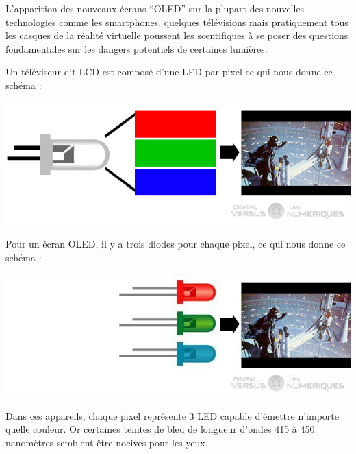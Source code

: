 \documentclass[12pt, a4paper]{report}
\begin{document}
L'apparition des nouveaux écrans ``OLED'' sur la plupart des nouvelles technologies comme les smartphones, quelques télévisions mais pratiquement tous les casques de la réalité virtuelle poussent les scentifiques  à se poser des questions fondamentales sur les dangers potentiels de certaines lumières.

Un téléviseur dit  LCD  est composé d'une LED par pixel ce qui nous donne ce schéma :

\begin{center}
\includegraphics[scale=0.5]{led.jpg}
\end{center}


Pour un écran OLED, il y a trois diodes pour chaque pixel, ce qui nous donne ce schéma :

\begin{center}
\includegraphics[scale=0.5]{oled.jpg}
\end{center}

Dans ces appareils, chaque pixel représente 3 LED capable d'émettre n'importe quelle couleur. Or certaines teintes de bleu de longueur d'ondes 415 à 450 nanomètres semblent être nocives pour les yeux.
\end{document}
